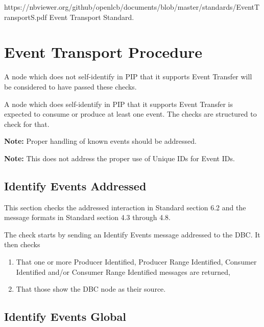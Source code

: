 



\maketitle
\thispagestyle{firststyle}

\introductionCaveats
    {https://nbviewer.org/github/openlcb/documents/blob/master/standards/EventTransportS.pdf}
    {Event Transport Standard}.

\section{Event Transport Procedure}


A node which does not self-identify in PIP that it supports
Event Transfer will be considered to have passed these checks.
\pipsetFootnote

A node which does self-identify in PIP that it supports 
Event Transfer is expected to consume or produce at least 
one event.  The checks are structured to check for that.

\textbf{Note:}  Proper handling of known events should be addressed.

\textbf{Note:}  This does not address the proper use of Unique IDs for Event IDs.

\subsection{Identify Events Addressed}

This section checks the addressed interaction in Standard section 6.2 and
the message formats in Standard section 4.3 through 4.8.

The check starts by sending an Identify Events message addressed to the DBC.
It then checks

\begin{enumerate}
\item That one or more Producer Identified, Producer Range Identified, 
        Consumer Identified and/or Consumer Range Identified messages are returned,
\item That those show the DBC node as their source.
\end{enumerate}

\subsection{Identify Events Global}

